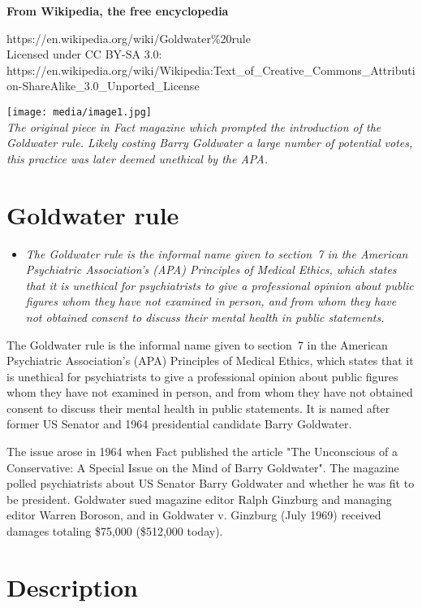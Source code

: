 \textbf{From Wikipedia, the free encyclopedia}

https://en.wikipedia.org/wiki/Goldwater\%20rule\\
Licensed under CC BY-SA 3.0:\\
https://en.wikipedia.org/wiki/Wikipedia:Text\_of\_Creative\_Commons\_Attribution-ShareAlike\_3.0\_Unported\_License

\texttt{[image: media/image1.jpg]}\\
\emph{The original piece in Fact magazine which prompted the
introduction of the Goldwater rule. Likely costing Barry Goldwater a
large number of potential votes, this practice was later deemed
unethical by the APA.}

\section{Goldwater rule}\label{goldwater-rule}

\begin{itemize}
\item
  \emph{The Goldwater rule is the informal name given to section~7 in
  the American Psychiatric Association's (APA) Principles of Medical
  Ethics, which states that it is unethical for psychiatrists to give a
  professional opinion about public figures whom they have not examined
  in person, and from whom they have not obtained consent to discuss
  their mental health in public statements.}
\end{itemize}

The Goldwater rule is the informal name given to section~7 in the
American Psychiatric Association's (APA) Principles of Medical Ethics,
which states that it is unethical for psychiatrists to give a
professional opinion about public figures whom they have not examined in
person, and from whom they have not obtained consent to discuss their
mental health in public statements. It is named after former US Senator
and 1964 presidential candidate Barry Goldwater.

The issue arose in 1964 when Fact published the article "The Unconscious
of a Conservative: A Special Issue on the Mind of Barry Goldwater". The
magazine polled psychiatrists about US Senator Barry Goldwater and
whether he was fit to be president. Goldwater sued magazine editor Ralph
Ginzburg and managing editor Warren Boroson, and in Goldwater v.
Ginzburg (July 1969) received damages totaling \$75,000 (\$512,000
today).

\section{Description}\label{description}

